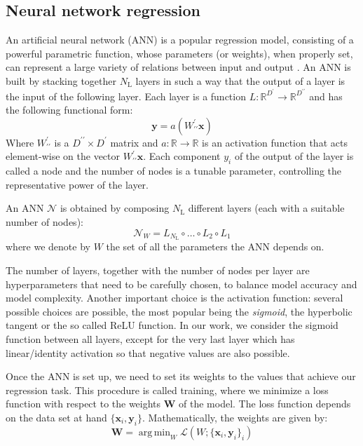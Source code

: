 \documentclass[twocolumn,showpacs,preprintnumbers,nofootinbib,prd,
superscriptaddress,10pt]{revtex4-2}
\newcommand{\R}{\mathbb{R}}
\DeclareMathOperator*{\argmin}{arg\,min}
\begin{document}

\subsection{Neural network regression}
\label{sec:NN}

An artificial neural network (ANN) is a popular regression model, consisting of a powerful parametric function, 
whose parameters (or weights), when properly set, can represent a large variety of relations between input and output \cite{Bishop2006machinelearning, murphy2012machine, Goodfellow-et-al-2016}.
An ANN is built by stacking together $N_\text{L}$ layers in such a way that the output of a layer is the input of the 
following layer. Each layer is a function $L: \R^{D^\prime} \rightarrow \R^{D^{\prime\prime}} $ and has the following 
functional form:
\begin{equation}
	\boldsymbol{y} = a(W^{\prime}_{\prime\prime}\boldsymbol{x})
\end{equation}
%
Where $W^{\prime}_{\prime\prime}$ is a $D^{\prime\prime} \times D^{\prime}$ matrix and $a: \R \rightarrow \R$ is an activation function that acts element-wise on the vector $W^{\prime}_{\prime\prime}\boldsymbol{x}$.
Each component $y_i$ of the output of the layer is called a node and the number of nodes is a tunable parameter, controlling the representative power of the layer.

An ANN $\mathcal{N}$ is obtained by composing $N_\text{L}$ different layers (each with a suitable number of nodes):
%
\begin{equation}
	\mathcal{N}_W = L_{N_\text{L}} \circ \hdots \circ L_2 \circ L_1
\end{equation}
%
where we denote by $W$ the set of all the parameters the ANN depends on.

The number of layers, together with the number of nodes per layer are hyperparameters that need to be carefully chosen, to balance model accuracy and model complexity.
Another important choice is the activation function: several possible choices are possible, the most popular being the {\it sigmoid}, the hyperbolic tangent or the so called ReLU function. In our work, we consider the sigmoid function between all layers, except for the very last layer which has linear/identity activation so that negative values are also possible.

Once the ANN is set up, we need to set its weights to the values that achieve our regression task.
This procedure is called training, where we minimize a loss function with respect to the weights $\boldsymbol{W}$ of the model.
The loss function depends on the data set at hand ${\{\boldsymbol{x}_i, \boldsymbol{y}_i\}}$.
Mathematically, the weights are given by:
%
\begin{equation}\label{eq:loss_general}
	\boldsymbol{W} = \argmin_W \mathcal{L}(W; \{\boldsymbol{x}_i, \boldsymbol{y}_i\}_i)
\end{equation}
\end{document}
